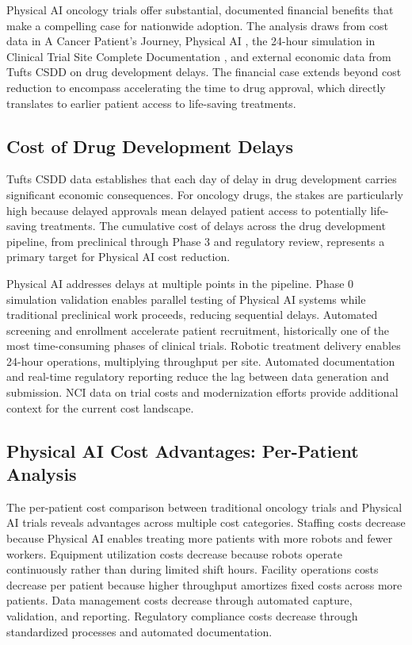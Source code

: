
Physical AI oncology trials offer substantial, documented financial benefits
that make a compelling case for nationwide adoption. The analysis draws from
cost data in A Cancer Patient's Journey, Physical AI
\cite{patient-journey-paper}, the 24-hour simulation in Clinical Trial Site
Complete Documentation \cite{site-docs}, and external economic data from Tufts
CSDD \cite{tufts-delay} on drug development delays. The financial case extends
beyond cost reduction to encompass accelerating the time to drug approval,
which directly translates to earlier patient access to life-saving treatments.

\subsection{Cost of Drug Development Delays}
\label{subsec:financial-delays}

Tufts CSDD \cite{tufts-delay} data establishes that each day of delay in drug
development carries significant economic consequences. For oncology drugs, the
stakes are particularly high because delayed approvals mean delayed patient
access to potentially life-saving treatments. The cumulative cost of delays
across the drug development pipeline, from preclinical through Phase 3 and
regulatory review, represents a primary target for Physical AI cost reduction.

Physical AI addresses delays at multiple points in the pipeline. Phase 0
simulation validation enables parallel testing of Physical AI systems while
traditional preclinical work proceeds, reducing sequential delays. Automated
screening and enrollment accelerate patient recruitment, historically one of
the most time-consuming phases of clinical trials. Robotic treatment delivery
enables 24-hour operations, multiplying throughput per site. Automated
documentation and real-time regulatory reporting reduce the lag between data
generation and submission. NCI data on trial costs \cite{nci-trials-paying}
and modernization efforts \cite{nci-modernizing} provide additional context
for the current cost landscape.

\subsection{Physical AI Cost Advantages: Per-Patient Analysis}
\label{subsec:financial-per-patient}

The per-patient cost comparison between traditional oncology trials and Physical
AI trials reveals advantages across multiple cost categories. Staffing costs
decrease because Physical AI enables treating more patients with more robots and
fewer workers. Equipment utilization costs decrease because robots operate
continuously rather than during limited shift hours. Facility operations costs
decrease per patient because higher throughput amortizes fixed costs across more
patients. Data management costs decrease through automated capture, validation,
and reporting. Regulatory compliance costs decrease through standardized
processes and automated documentation.

